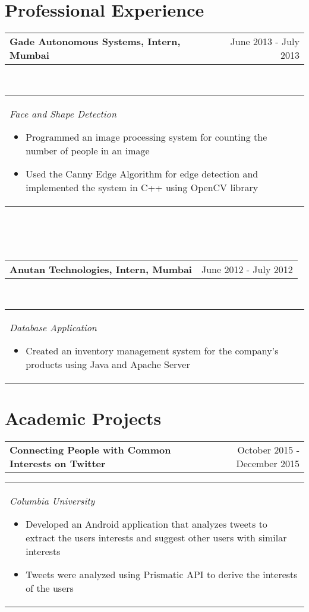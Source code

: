 \documentclass[margin,line]{res}
\begin{document}
\begin{resume}
\section{\sc \bf Professional Experience}
\begin{tabular}{p{4.41in}  r}
\bf Gade Autonomous Systems, Intern, Mumbai  & June 2013 - July 2013
\end{tabular}
\\
\begin{tabular}{p{5.92in}}
\it Face and Shape Detection
\begin{itemize}
    \item \textup {Programmed an image processing system for counting the number of people in an image}
    \item \textup {Used the Canny Edge Algorithm for edge detection and implemented the system in C++ using OpenCV library}
\end{itemize}
\end{tabular}
\\\\\\
\begin{tabular}{p{4.4in}  r}
\bf Anutan Technologies, Intern, Mumbai & June 2012 - July 2012
\end{tabular}
\\
\begin{tabular}{p{5.92in}}
\it Database Application
\begin{itemize}
    \item \textup{Created an inventory management system for the company's products using Java and Apache Server}
\end{itemize}
\end{tabular}



\section{\sc \bf Academic Projects}

\begin{tabular}{p{3.875in} r}
\bf Connecting People with Common Interests on Twitter & October 2015 - December 2015
\end{tabular}
\begin{tabular} {p{5.92in}}
\it Columbia University 
\begin{itemize}
    \item \textup{Developed an Android application that analyzes tweets to extract the users interests and suggest other users with similar interests}
    \item \textup{Tweets were analyzed using Prismatic API to derive the interests of the users}
\end{itemize}
\end{tabular}


\end{resume}
\end{document}
